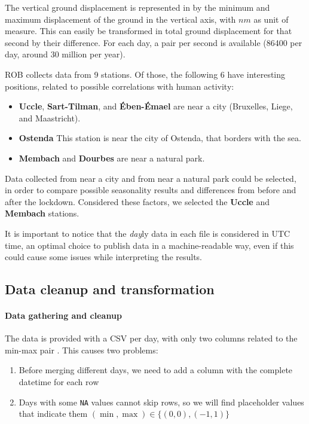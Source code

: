 \documentclass[12pt]{article}
\begin{document}
The vertical ground displacement is represented in by the minimum and maximum displacement of the ground in the vertical axis, with $nm$ as unit of measure. This can easily be transformed in total ground displacement for that second by their difference.
For each day, a pair per second is available (86400 per day, around 30 million per year).

ROB collects data from 9 stations. Of those, the following 6 have interesting positions, related to possible correlations with human activity:
\begin{itemize}
	\item \textbf{Uccle}, \textbf{Sart-Tilman}, and \textbf{Ében-Émael} are near a city (Bruxelles, Liege, and Maastricht).
	\item \textbf{Ostenda} This station is near the city of Ostenda, that borders with the sea.
	\item \textbf{Membach} and \textbf{Dourbes} are near a natural park.
\end{itemize}

Data collected from near a city and from near a natural park could be selected, in order to compare possible seasonality results and differences from before and after the lockdown. %
Considered these factors, we selected the \textbf{Uccle} and \textbf{Membach} stations.

It is important to notice that the \textit{day}ly data in each file is considered in UTC time, an optimal choice to publish data in a machine-readable way, even if this could cause some issues while interpreting the results.

\subsection{Data cleanup and transformation}
\paragraph{Data gathering and cleanup}
The data is provided with a CSV per day, with only two columns related to the min-max pair \cite{Data20200402}. This causes two problems:
\begin{enumerate}
	\item Before merging different days, we need to add a column with the complete datetime for each row
	\item Days with some \texttt{NA} values cannot skip rows, so we will find placeholder values that indicate them $(\min, \max) \in \{(0,0), (-1,1)\}$
\end{enumerate}
\end{document}
